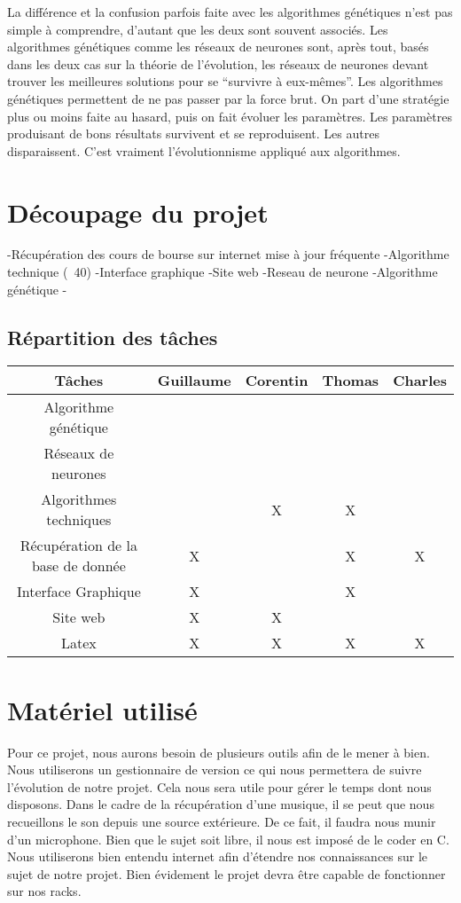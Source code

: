 \documentclass[a4paper,12pt]{article}
\begin{document}
La différence et la confusion parfois faite avec les algorithmes génétiques n’est pas simple à comprendre, d’autant que les deux sont souvent associés. Les algorithmes génétiques comme les réseaux de neurones sont, après tout, basés dans les deux cas sur la théorie de l’évolution, les réseaux de neurones devant trouver les meilleures solutions pour se “survivre à eux-mêmes”. Les algorithmes génétiques permettent de ne pas passer par la force brut. On part d’une stratégie plus ou moins faite au hasard, puis on fait évoluer les paramètres. Les paramètres produisant de bons résultats survivent et se reproduisent. Les autres disparaissent. C’est vraiment l’évolutionnisme appliqué aux algorithmes.

\newpage

\section{Découpage du projet}

-Récupération des cours de bourse sur internet mise à jour fréquente
-Algorithme technique (~40)
-Interface graphique 
-Site web
-Reseau de neurone 
-Algorithme génétique 
-

\newpage

\subsection{Répartition des tâches}
\begin{tabular}{|c||c|c|c|c|}
\hline
Tâches & Guillaume & Corentin & Thomas & Charles\\
\hline
Algorithme génétique & & & & \\
\hline
Réseaux de neurones & & & & \\
\hline
Algorithmes techniques & & X & X & \\
\hline
Récupération de la base de donnée & X & & X & X \\
\hline
Interface Graphique & X & & X &\\
\hline
Site web & X & X & &\\
\hline
Latex & X & X & X & X \\
\hline 
\end{tabular}

\section{Matériel utilisé}

Pour ce projet, nous aurons besoin de plusieurs outils afin de le mener à bien. Nous utiliserons un gestionnaire de version ce qui nous permettera de suivre l'évolution de notre projet. Cela nous sera utile pour gérer le temps dont nous disposons. Dans le cadre de la récupération d'une musique, il se peut que nous recueillons le son depuis une source extérieure. De ce fait, il faudra nous munir d'un microphone. Bien que le sujet soit libre, il nous est imposé de le coder en C. Nous utiliserons bien entendu internet afin d'étendre nos connaissances sur le sujet de notre projet. Bien évidement le projet devra être capable de fonctionner sur nos racks.
\end{document}
